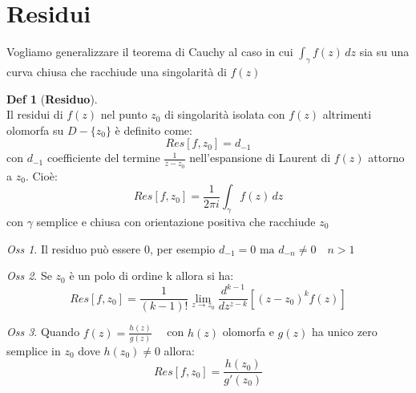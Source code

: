 \documentclass[a4paper,11pt]{report}
\theoremstyle{remark}
\newtheorem*{oss}{Oss}
\theoremstyle{definition}
\newtheorem*{Def}{Def}
\begin{document}
\section{Residui}
	Vogliamo generalizzare il teorema di Cauchy al caso in cui $\int_\gamma f(z)\,dz$ sia su una curva chiusa che racchiude una singolarità di $f(z)$
	\begin{Def}[\textbf{Residuo}]\hfil\\
		Il residui di $f(z)$ nel punto $z_0$ di singolarità isolata con $f(z)$ altrimenti olomorfa su $D - \{z_0\}$ è definito come:
		\begin{equation*}
			Res[f,z_0] = d_{-1} 
		\end{equation*}
		con $d_{-1}$ coefficiente del termine $\frac{1}{z-z_0}$ nell'espansione di Laurent di $f(z)$ attorno a $z_0$. Cioè:
		\begin{equation*}
			Res[f,z_0] = \frac{1}{2 \pi i} \int_\gamma f(z)\,dz
		\end{equation*}
		con $\gamma$ semplice e chiusa con orientazione positiva che racchiude $z_0$
	\end{Def}

	\begin{oss}
		Il residuo può essere 0, per esempio $d_{-1} = 0 \mbox{ ma } d_{-n} \neq 0 \quad n>1$
	\end{oss}

	\begin{oss}
		Se $z_0$ è un polo di ordine k allora si ha:
		\begin{equation*}
			Res[f,z_0] = \frac{1}{(k-1)!} \lim_{z \to z_0} \frac{d^{k-1}}{dz^{z-k}} [(z-z_0)^kf(z)]
		\end{equation*}
	\end{oss}

	\begin{oss}
		Quando $f(z) = \frac{h(z)}{g(z)} \quad$ con $h(z)$ olomorfa e $g(z)$ ha unico zero semplice in $z_0$ dove $h(z_0) \neq 0$ allora:
		\begin{equation*}
			Res[f,z_0] = \frac{h(z_0)}{g'(z_0)}
		\end{equation*}
	\end{oss}
\end{document}
